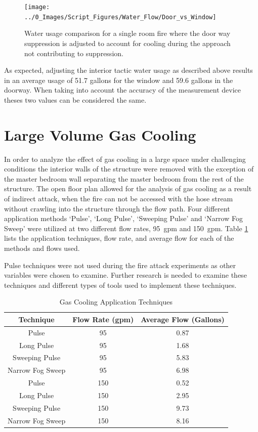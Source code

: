 \documentclass[12pt,oneside]{book}
\begin{document}
\begin{figure}[H]
\centering
\texttt{[image: ../0\_Images/Script\_Figures/Water\_Flow/Door\_vs\_Window]}
\caption[Water Usage For Single Room]{Water usage comparison for a single room fire where the door way suppression is adjusted to account for cooling during the approach not contributing to suppression.}
\label{fig:Door_vs_window}
\end{figure}

As expected, adjusting the interior tactic water usage as described above results in an average usage of 51.7 gallons for the window and 59.6 gallons in the doorway. When taking into account the accuracy of the measurement device theses two values can be considered the same.  

\section{Large Volume Gas Cooling}
In order to analyze the effect of gas cooling in a large space under challenging conditions the interior walls of the structure were removed with the exception of the master bedroom wall separating the master bedroom from the rest of the structure. The open floor plan allowed for the analysis of gas cooling as a result of indirect attack, when the fire can not be accessed with the hose stream without crawling into the structure through the flow path. Four different application methods `Pulse', `Long Pulse', `Sweeping Pulse' and `Narrow Fog Sweep' were utilized at two different flow rates, 95~gpm and 150~gpm. Table \ref{tab:Gas_Cooling_Techniques} lists the application techniques, flow rate, and average flow for each of the methods and flows used. 

Pulse techniques were not used during the fire attack experiments as other variables were chosen to examine.  Further research is needed to examine these techniques and different types of tools used to implement these techniques.

\begin{table}[H]
\centering
\caption{Gas Cooling Application Techniques}
\begin{tabular}{|c|c|c|}
\hline
Technique & Flow Rate (gpm) & Average Flow (Gallons)\\ \hline \hline
Pulse & 95 & 0.87 \\ \hline
Long Pulse & 95 & 1.68 \\ \hline
Sweeping Pulse & 95 & 5.83 \\ \hline
Narrow Fog Sweep & 95 & 6.98 \\ \hline
Pulse & 150 & 0.52 \\ \hline
Long Pulse & 150 & 2.95 \\ \hline
Sweeping Pulse & 150 & 9.73 \\ \hline
Narrow Fog Sweep & 150 & 8.16 \\ \hline
\end{tabular}
\label{tab:Gas_Cooling_Techniques}
\end{table}
\end{document}
